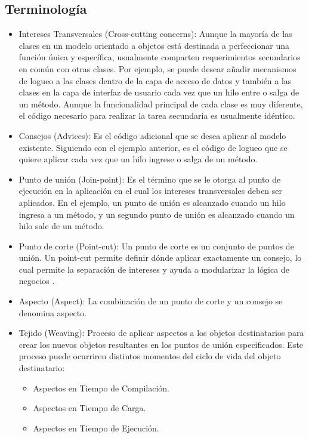 \subsection{Terminología}
\label{sec:aop_terminologia}
\begin{itemize}
  \item Intereses Transversales (Cross-cutting concerns): Aunque la mayoría de
  las clases en un modelo orientado a objetos está destinada a perfeccionar una función única y
  específica, usualmente comparten requerimientos secundarios en común con otras
  clases. Por ejemplo, se puede desear añadir mecanismos de logueo a las clases
  dentro de la capa de acceso de datos y también a las clases en la capa de
  interfaz de usuario cada vez que un hilo entre o salga de un método. Aunque la
  funcionalidad principal de cada clase es muy diferente, el código necesario
  para realizar la tarea secundaria es usualmente
  idéntico.\cite{Introduction_To_Aspect}
  
  \item Consejos (Advices): Es el código adicional que se desea aplicar al
  modelo existente. Siguiendo con el ejemplo anterior, es el código de logueo
  que se quiere aplicar cada vez que un hilo ingrese o salga de un
  método.\cite{Introduction_To_Aspect}
  
  \item Punto de unión (Join-point): Es el término que se le otorga al punto
  de ejecución en la aplicación en el cual los intereses transversales deben ser
  aplicados. En el ejemplo, un punto de unión es alcanzado cuando un hilo
  ingresa a un método, y un segundo punto de unión es alcanzado cuando un hilo
  sale de un método.
  
  \item Punto de corte (Point-cut): Un punto de corte es un conjunto de puntos
  de unión. Un point-cut permite definir dónde aplicar exactamente un consejo,
  lo cual permite la separación de intereses y ayuda a modularizar la lógica de
  negocios \cite{Classification_Of_Pointcut_Language_Constructs}.
  
  \item Aspecto (Aspect): La combinación de un punto de corte y un consejo se
  denomina aspecto. \cite{Introduction_To_Aspect}
  
  \item Tejido (Weaving): Proceso de aplicar aspectos a los objetos
  destinatarios para crear los nuevos objetos resultantes en los  puntos de
  unión especificados. Este proceso puede ocurriren distintos momentos del ciclo
  de vida del objeto destinatario:
  	\begin{itemize}
		\item Aspectos en Tiempo de Compilación.
		\item Aspectos en Tiempo de Carga.
		\item Aspectos en Tiempo de Ejecución.
	\end{itemize}
\end{itemize} 